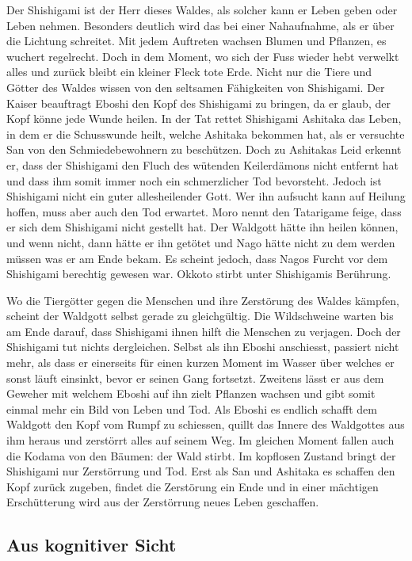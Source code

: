 Der Shishigami ist der Herr dieses Waldes, als solcher kann er Leben geben oder Leben nehmen. Besonders deutlich wird das bei einer Nahaufnahme, als er über die Lichtung schreitet. Mit jedem Auftreten wachsen Blumen und Pflanzen, es wuchert regelrecht. Doch in dem Moment, wo sich der Fuss wieder hebt verwelkt alles und zurück bleibt ein kleiner Fleck tote Erde. Nicht nur die Tiere und Götter des Waldes wissen von den seltsamen Fähigkeiten von Shishigami. Der Kaiser beauftragt Eboshi den Kopf des Shishigami zu bringen, da er glaub, der Kopf könne jede Wunde heilen. In der Tat rettet Shishigami Ashitaka das Leben, in dem er die Schusswunde heilt, welche Ashitaka bekommen hat, als er versuchte San von den Schmiedebewohnern zu beschützen. Doch zu Ashitakas Leid erkennt er, dass der Shishigami den Fluch des wütenden Keilerdämons nicht entfernt hat und dass ihm somit immer noch ein schmerzlicher Tod bevorsteht. Jedoch ist Shishigami nicht ein guter allesheilender Gott. Wer ihn aufsucht kann auf Heilung hoffen, muss aber auch den Tod erwartet. Moro nennt den Tatarigame feige, dass er sich dem Shishigami nicht gestellt hat. Der Waldgott hätte ihn heilen können, und wenn nicht, dann hätte er ihn getötet und Nago hätte nicht zu dem werden müssen was er am Ende bekam. Es scheint jedoch, dass Nagos Furcht vor dem Shishigami berechtig gewesen war. Okkoto stirbt unter Shishigamis Berührung.

Wo die Tiergötter gegen die Menschen und ihre Zerstörung des Waldes kämpfen, scheint der Waldgott selbst gerade zu gleichgültig. Die Wildschweine warten bis am Ende darauf, dass Shishigami ihnen hilft die Menschen zu verjagen. Doch der Shishigami tut nichts dergleichen. Selbst als ihn Eboshi anschiesst, passiert nicht mehr, als dass er einerseits für einen kurzen Moment im Wasser über welches er sonst läuft einsinkt, bevor er seinen Gang fortsetzt. Zweitens lässt er aus dem Geweher mit welchem Eboshi auf ihn zielt Pflanzen wachsen und gibt somit einmal mehr ein Bild von Leben und Tod. Als Eboshi es endlich schafft dem Waldgott den Kopf vom Rumpf zu schiessen, quillt das Innere des Waldgottes aus ihm heraus und zerstörrt alles auf seinem Weg. Im gleichen Moment fallen auch die Kodama von den Bäumen: der Wald stirbt. Im kopflosen Zustand bringt der Shishigami nur Zerstörrung und Tod. Erst als San und Ashitaka es schaffen den Kopf zurück zugeben, findet die Zerstörung ein Ende und in einer mächtigen Erschütterung wird aus der Zerstörrung neues Leben geschaffen. 

\subsection{Aus kognitiver Sicht}
